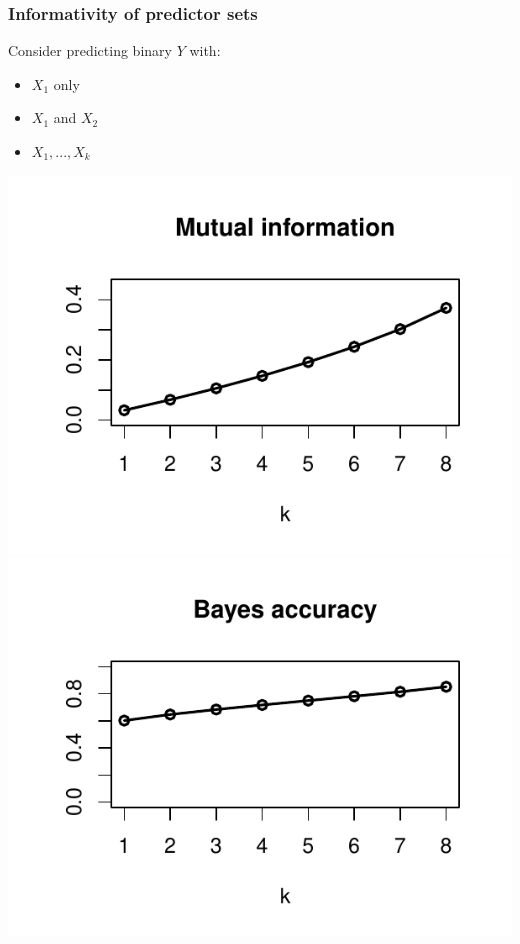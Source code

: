\documentclass{beamer}
\begin{document}
\begin{frame}
\frametitle{Informativity of predictor sets}

Consider predicting binary $Y$ with:
\begin{itemize}
\item $X_1$ only
\item $X_1$ and $X_2$
\item $X_1, ..., X_k$
\end{itemize}

\begin{center}
\includegraphics[scale = 0.6, clip = true, trim = 0.1in 0.1in 0.1in 0.2in]{../diagram/informativity1.pdf}
\includegraphics[scale = 0.6, clip = true, trim = 0.1in 0.1in 0.1in 0.2in]{../diagram/informativity2.pdf}
\end{center}

\end{frame}
\end{document}
